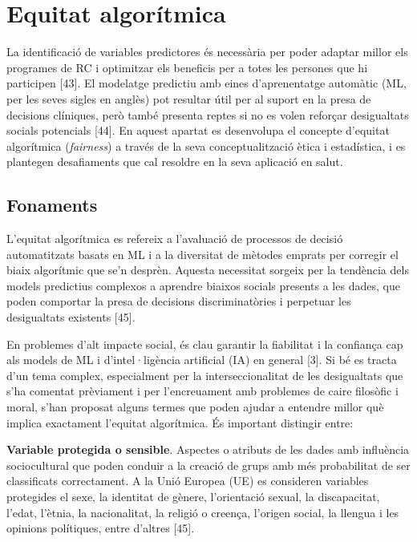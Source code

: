 \documentclass[CAT]{TFUOC}%
\begin{document}
\section{Equitat algorítmica}\label{equitat-algoruxedtmica}

La identificació de variables predictores és necessària per poder adaptar millor els programes de RC i optimitzar els beneficis per a totes les persones que hi participen {[}43{]}. El modelatge predictiu amb eines d'aprenentatge automàtic (ML, per les seves sigles en anglès) pot resultar útil per al suport en la presa de decisions clíniques, però també presenta reptes si no es volen reforçar desigualtats socials potencials {[}44{]}. En aquest apartat es desenvolupa el concepte d'equitat algorítmica (\emph{fairness}) a través de la seva conceptualització ètica i estadística, i es plantegen desafiaments que cal resoldre en la seva aplicació en salut.

\subsection{Fonaments}\label{fonaments}

L'equitat algorítmica es refereix a l'avaluació de processos de decisió automatitzats basats en ML i a la diversitat de mètodes emprats per corregir el biaix algorítmic que se'n desprèn. Aquesta necessitat sorgeix per la tendència dels models predictius complexos a aprendre biaixos socials presents a les dades, que poden comportar la presa de decisions discriminatòries i perpetuar les desigualtats existents {[}45{]}.

En problemes d'alt impacte social, és clau garantir la fiabilitat i la confiança cap als models de ML i d'intel·ligència artificial (IA) en general {[}3{]}. Si bé es tracta d'un tema complex, especialment per la interseccionalitat de les desigualtats que s'ha comentat prèviament i per l'encreuament amb problemes de caire filosòfic i moral, s'han proposat alguns termes que poden ajudar a entendre millor què implica exactament l'equitat algorítmica. És important distingir entre:

\bigskip

\textbf{Variable protegida o sensible}. Aspectes o atributs de les dades amb influència sociocultural que poden conduir a la creació de grups amb més probabilitat de ser classificats correctament. A la Unió Europea (UE) es consideren variables protegides el sexe, la identitat de gènere, l'orientació sexual, la discapacitat, l'edat, l'ètnia, la nacionalitat, la religió o creença, l'origen social, la llengua i les opinions polítiques, entre d'altres {[}45{]}.
\end{document}

